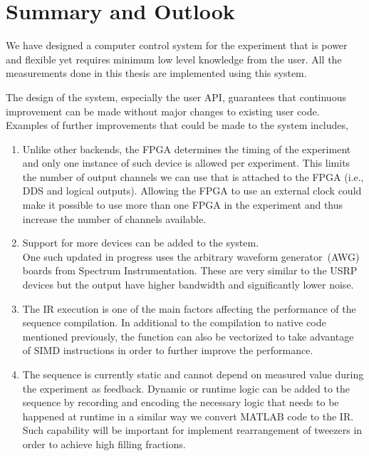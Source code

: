 \section{Summary and Outlook}
\label{ch:computer-control:summary}

We have designed a computer control system for the experiment
that is power and flexible yet requires minimum low level knowledge from the user.
All the measurements done in this thesis are implemented using this system.

The design of the system, especially the user API,
guarantees that continuous improvement can be made
without major changes to existing user code.
Examples of further improvements that could be made to the system includes,
\begin{enumerate}
\item Unlike other backends, the FPGA determines the timing of the experiment
  and only one instance of such device is allowed per experiment.
  This limits the number of output channels we can use that is attached to the FPGA
  (i.e., DDS and logical outputs).
  Allowing the FPGA to use an external clock could make it possible
  to use more than one FPGA in the experiment
  and thus increase the number of channels available.
\item Support for more devices can be added to the system.\\
  One such updated in progress uses the arbitrary waveform generator~(AWG) boards
  from Spectrum Instrumentation.
  These are very similar to the USRP devices but the output have higher bandwidth
  and significantly lower noise.
\item The IR execution is one of the main factors affecting the performance
  of the sequence compilation.
  In additional to the compilation to native code mentioned previously,
  the function can also be vectorized to take advantage of SIMD instructions
  in order to further improve the performance.
\item The sequence is currently static and cannot depend on measured value
  during the experiment as feedback.
  Dynamic or runtime logic can be added to the sequence
  by recording and encoding the necessary logic that needs to be happened at runtime
  in a similar way we convert MATLAB code to the IR.
  Such capability will be important for implement rearrangement of tweezers
  in order to achieve high filling fractions.
\end{enumerate}
